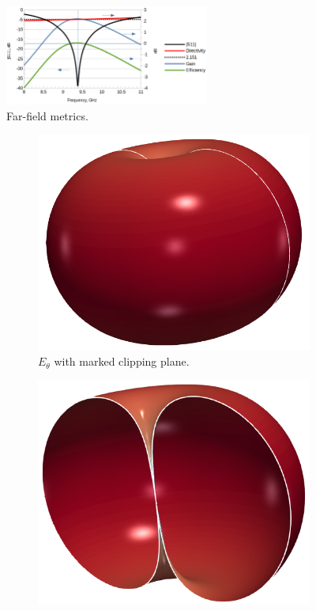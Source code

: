 \documentclass[titlepage]{article}
\renewcommand\_{\textunderscore\linebreak[1]}
\begin{document}
\begin{figure}[H]
  \centering
  \includegraphics[width=0.6\textwidth]{../regression/OpenParEM3D/antenna/dipole_study/screenshots/dipole_gain}
  \caption{Far-field metrics.}
  \label{fig:dipole_gain}
\end{figure}

\begin{figure}[H]
  \centering
  \begin{subfigure}[t]{0.33\textwidth}
     \includegraphics[width=1\linewidth]{../regression/OpenParEM3D/antenna/dipole_study/screenshots/dipole_pattern}
     \caption{$E_\theta$ with marked clipping plane.}
  \end{subfigure}
  \begin{subfigure}[t]{0.33\textwidth}
     \includegraphics[width=1\linewidth]{../regression/OpenParEM3D/antenna/dipole_study/screenshots/dipole_pattern_clip}

\end{subfigure}
\end{figure}
\end{document}
